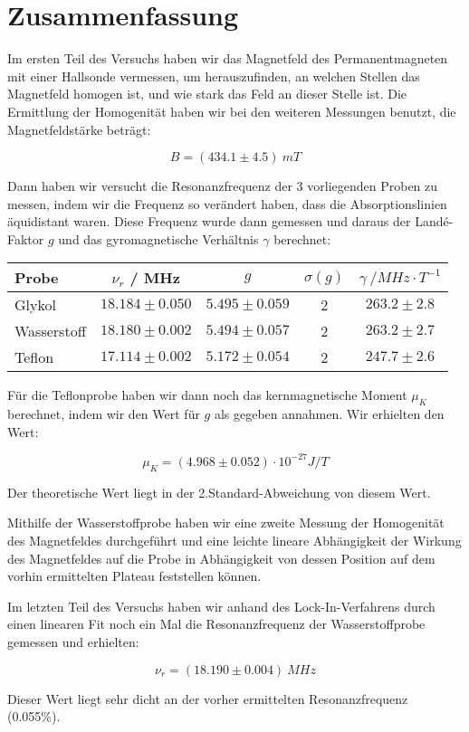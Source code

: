 \clearpage
\section{Zusammenfassung}

Im ersten Teil des Versuchs haben wir das Magnetfeld des Permanentmagneten mit einer Hallsonde vermessen, um herauszufinden, an welchen Stellen das Magnetfeld homogen ist, und wie stark das Feld an dieser Stelle ist. Die Ermittlung der Homogenität haben wir bei den weiteren Messungen benutzt, die Magnetfeldstärke beträgt:

$$ \boxed{B = (434.1 \pm 4.5)\ mT} $$

Dann haben wir versucht die Resonanzfrequenz der 3 vorliegenden Proben zu messen, indem wir die Frequenz so verändert haben, dass die Absorptionslinien äquidistant waren. Diese Frequenz wurde dann gemessen und daraus der Landé-Faktor $g$ und das gyromagnetische Verhältnis $\gamma$ berechnet:


\begin{center}
\begin{tabular}{| l | c | c | c | c |} \hline
Probe & $\nu_r$ / MHz & $g$ & $\sigma(g)$ & $\gamma\ / MHz\cdot T^{-1}$\\ \hline
Glykol & $18.184 \pm 0.050$ & $5.495 \pm 0.059$ & 2 & $263.2 \pm 2.8$ \\
Wasserstoff &$18.180 \pm 0.002$ & $ 5.494 \pm 0.057 $ & 2 & $263.2 \pm 2.7$ \\
Teflon & $17.114 \pm 0.002$ &  $5.172 \pm 0.054$ & 2 & $247.7 \pm 2.6$\\ \hline
\end{tabular}
\end{center}

Für die Teflonprobe haben wir dann noch das kernmagnetische Moment $\mu_K$ berechnet, indem wir den Wert für $g$ als gegeben annahmen. Wir erhielten den Wert:

$$\boxed{\mu_K = (4.968 \pm 0.052)\cdot 10^{-27} J/T} $$

Der theoretische Wert liegt in der 2.Standard-Abweichung von diesem Wert.

Mithilfe der Wasserstoffprobe haben wir eine zweite Messung der Homogenität des Magnetfeldes durchgeführt und eine leichte lineare Abhängigkeit der Wirkung des Magnetfeldes auf die Probe in Abhängigkeit von dessen Position auf dem vorhin ermittelten Plateau feststellen können.

Im letzten Teil des Versuchs haben wir anhand des Lock-In-Verfahrens durch einen linearen Fit noch ein Mal die Resonanzfrequenz der Wasserstoffprobe gemessen und erhielten:

$$\boxed{\nu_r = (18.190 \pm 0.004)\ MHz}$$

Dieser Wert liegt sehr dicht an der vorher ermittelten Resonanzfrequenz (0.055\%).